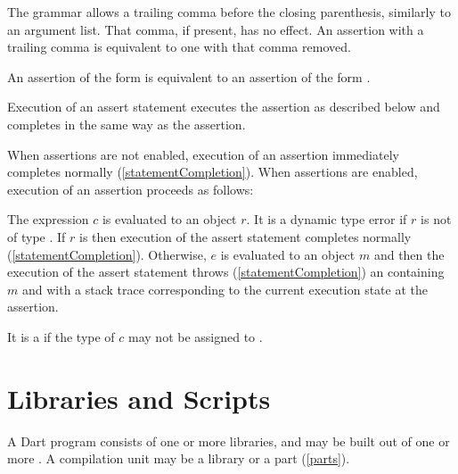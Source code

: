 \documentclass[makeidx]{article}
\begin{document}
\LMHash{}%
The grammar allows a trailing comma before the closing parenthesis,
similarly to an argument list.
That comma, if present, has no effect.
An assertion with a trailing comma is equivalent to one with that comma removed.

\LMHash{}%
An assertion of the form  is equivalent to
an assertion of the form .

\LMHash{}%
Execution of an assert statement executes the assertion as described below
and completes in the same way as the assertion.

\LMHash{}%
When assertions are not enabled,
execution of an assertion immediately completes normally
(\ref{statementCompletion}).
When assertions are enabled,
execution of an assertion  proceeds as follows:

\LMHash{}%
The expression $c$ is evaluated to an object $r$.
It is a dynamic type error if $r$ is not of type .
If $r$ is \TRUE{} then execution of the assert statement completes normally
(\ref{statementCompletion}).
Otherwise, $e$ is evaluated to an object $m$
and then the execution of the assert statement throws
(\ref{statementCompletion})
an  containing $m$ and with
a stack trace corresponding to the current execution state at the assertion.

\LMHash{}%
It is a  if the type of $c$
may not be assigned to .



\section{Libraries and Scripts}

\LMHash{}%
A Dart program consists of one or more libraries,
and may be built out of one or more .
A compilation unit may be a library or a part (\ref{parts}).
\end{document}
